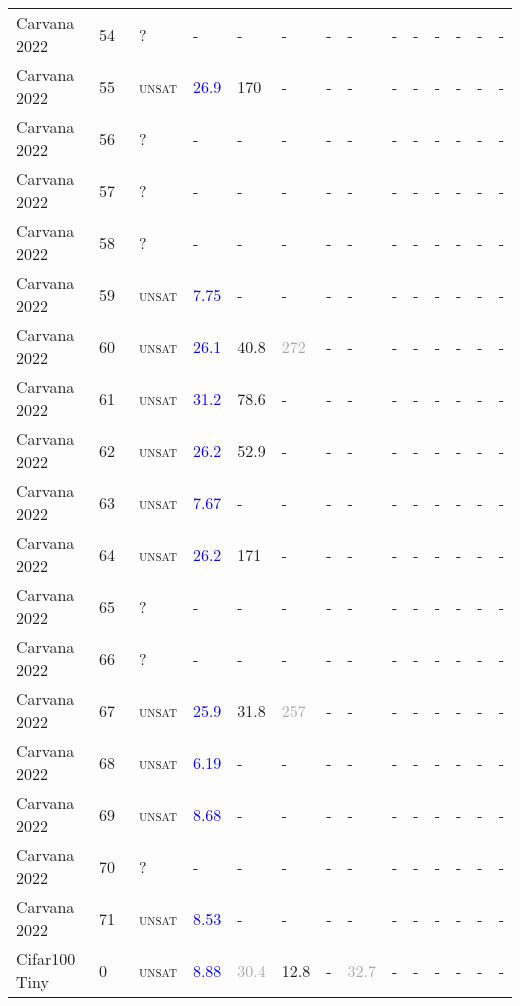 \begin{center}
{\begin{longtable}{@{}llllllllllllll@{}}
Carvana 2022 & 54 & ~? & - & - & - & - & - & - & - & - & - & - & - \\
Carvana 2022 & 55 & ~\textsc{unsat} & \textcolor{blue}{26.9} & \textcolor{second}{170} & - & - & - & - & - & - & - & - & - \\
Carvana 2022 & 56 & ~? & - & - & - & - & - & - & - & - & - & - & - \\
Carvana 2022 & 57 & ~? & - & - & - & - & - & - & - & - & - & - & - \\
Carvana 2022 & 58 & ~? & - & - & - & - & - & - & - & - & - & - & - \\
Carvana 2022 & 59 & ~\textsc{unsat} & \textcolor{blue}{7.75} & - & - & - & - & - & - & - & - & - & - \\
Carvana 2022 & 60 & ~\textsc{unsat} & \textcolor{blue}{26.1} & \textcolor{second}{40.8} & \textcolor{darkgray}{272} & - & - & - & - & - & - & - & - \\
Carvana 2022 & 61 & ~\textsc{unsat} & \textcolor{blue}{31.2} & \textcolor{second}{78.6} & - & - & - & - & - & - & - & - & - \\
Carvana 2022 & 62 & ~\textsc{unsat} & \textcolor{blue}{26.2} & \textcolor{second}{52.9} & - & - & - & - & - & - & - & - & - \\
Carvana 2022 & 63 & ~\textsc{unsat} & \textcolor{blue}{7.67} & - & - & - & - & - & - & - & - & - & - \\
Carvana 2022 & 64 & ~\textsc{unsat} & \textcolor{blue}{26.2} & \textcolor{second}{171} & - & - & - & - & - & - & - & - & - \\
Carvana 2022 & 65 & ~? & - & - & - & - & - & - & - & - & - & - & - \\
Carvana 2022 & 66 & ~? & - & - & - & - & - & - & - & - & - & - & - \\
Carvana 2022 & 67 & ~\textsc{unsat} & \textcolor{blue}{25.9} & \textcolor{second}{31.8} & \textcolor{darkgray}{257} & - & - & - & - & - & - & - & - \\
Carvana 2022 & 68 & ~\textsc{unsat} & \textcolor{blue}{6.19} & - & - & - & - & - & - & - & - & - & - \\
Carvana 2022 & 69 & ~\textsc{unsat} & \textcolor{blue}{8.68} & - & - & - & - & - & - & - & - & - & - \\
Carvana 2022 & 70 & ~? & - & - & - & - & - & - & - & - & - & - & - \\
Carvana 2022 & 71 & ~\textsc{unsat} & \textcolor{blue}{8.53} & - & - & - & - & - & - & - & - & - & - \\
\midrule
Cifar100 Tiny & 0 & ~\textsc{unsat} & \textcolor{blue}{8.88} & \textcolor{darkgray}{30.4} & \textcolor{second}{12.8} & - & \textcolor{darkgray}{32.7} & - & - & - & - & - & - \\

\end{longtable}}
\end{center}
